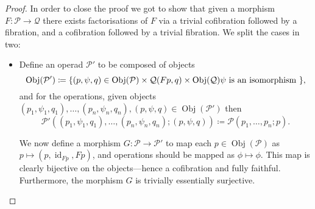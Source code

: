 \documentclass[11pt, reqno]{amsart}
\theoremstyle{definition}
\let\colon\relax
\DeclareMathOperator{\Obj}{Obj}   %
\DeclareMathOperator{\Id}{id}     %
\newcommand{\operad}{\mathcal}
\begin{document}
\begin{proof}
    In order to close the proof we got to show that given a morphism \(F:
    \operad P \to \operad Q\) there exists factorisations of \(F\) via a
    trivial cofibration followed by a fibration, and a cofibration followed by
    a trivial fibration. We split the cases in two:
    \begin{itemize}
        \item Define an operad \(\operad P'\) to be composed of objects
            \[
                \Obj(\operad P') \coloneq
                \{
                    (p, \psi, q) \in
                    \Obj(\operad P) \times \operad Q(F p, q) \times \Obj(\operad Q)
                    \colon \psi \text{ is an isomorphism }
                \},
            \]
            and for the operations, given objects \((p_1, \psi_1, q_1), \dots,
            (p_n, \psi_n, q_n), (p, \psi, q) \in \Obj(\operad P')\) then
            \[
                \operad P'(
                    (p_1, \psi_1, q_1), \dots, (p_n, \psi_n, q_n); (p, \psi, q) 
                ) \coloneq
                \operad P(p_1, \dots, p_n; p).
            \]

            We now define a morphism \(G: \operad P \to \operad P'\) to map
            each \(p \in \Obj(\operad P)\) as \(p \mapsto (p, \Id_{F p}, F
            p)\), and operations should be mapped as \(\phi \mapsto \phi\).
            This map is clearly bijective on the objects---hence a cofibration
            and fully faithful. Furthermore, the morphism \(G\) is trivially
            essentially surjective.


\end{itemize}
\end{proof}
\end{document}
